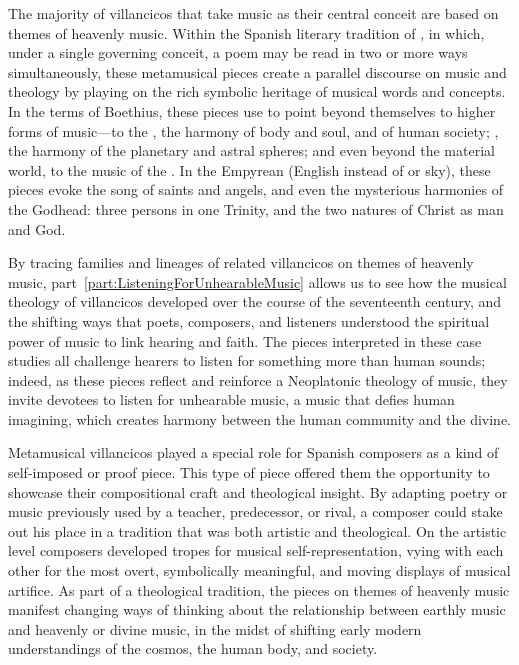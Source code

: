 
The majority of villancicos that take music as their central conceit are based
on themes of heavenly music.
Within the Spanish literary tradition of , in which, under a
single governing conceit, a poem may be read in two or more ways simultaneously,
these metamusical pieces create a parallel discourse on music and theology by
playing on the rich symbolic heritage of musical words and concepts.
In the terms of Boethius, these pieces use  to point
beyond themselves to higher forms of music---to the , the
harmony of body and soul, and of human society; , the
harmony of the planetary and astral spheres; and even beyond the material world,
to the music of the .
In the Empyrean (English  instead of  or sky), these
pieces evoke the song of saints and angels, and even the mysterious harmonies of
the Godhead: three persons in one Trinity, and the two natures of Christ as
man and God.

By tracing families and lineages of related villancicos on themes of heavenly
music, part~\ref{part:ListeningForUnhearableMusic} allows us to see how the
musical theology of villancicos developed over the course of the seventeenth
century, and the shifting ways that poets, composers, and listeners understood
the spiritual power of music to link hearing and faith.
The pieces interpreted in these case studies all challenge hearers to listen for
something more than human sounds; indeed, as these pieces reflect and reinforce
a Neoplatonic theology of music, they invite devotees to listen for unhearable
music, a music that defies human imagining, which creates harmony between the
human community and the divine.

Metamusical villancicos played a special role for Spanish composers as a kind of
self-imposed  or proof piece.
This type of piece offered them the opportunity to showcase their compositional
craft and theological insight. 
By adapting poetry or music previously used by a teacher, predecessor, or rival,
a composer could stake out his place in a tradition that was both artistic and
theological.
On the artistic level composers developed tropes for musical
self-representation, vying with each other for the most overt, symbolically
meaningful, and moving displays of musical artifice.
As part of a theological tradition, the pieces on themes of heavenly music
manifest changing ways of thinking about the relationship between earthly music
and heavenly or divine music, in the midst of shifting early modern
understandings of the cosmos, the human body, and society.

